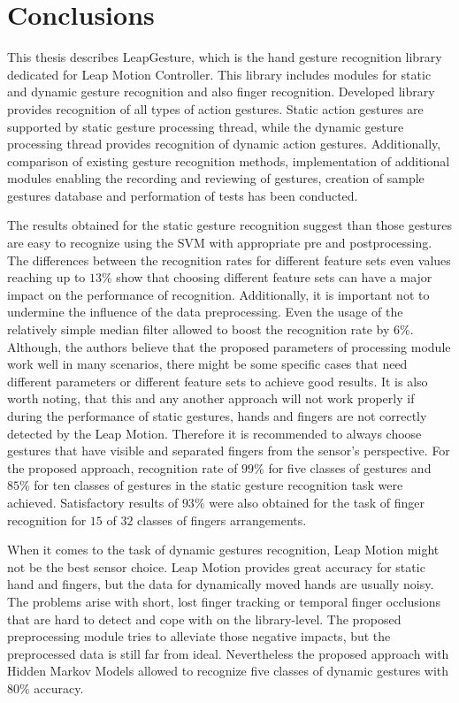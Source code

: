 \chapter{Conclusions}\label{conclusionsChapter}

This thesis describes LeapGesture, which is the hand gesture recognition library dedicated for Leap Motion Controller.
This library includes modules for static and dynamic gesture recognition and also finger recognition.
Developed library provides recognition of all types of action gestures.
Static action gestures are supported by static gesture processing thread, while the dynamic gesture processing thread provides recognition of dynamic action gestures.
Additionally, comparison of existing gesture recognition methods, implementation of additional modules enabling the recording and reviewing of gestures, creation of sample gestures database and performation of tests has been conducted.

The results obtained for the static gesture recognition suggest than those gestures are easy to recognize using the SVM with appropriate pre and postprocessing.
The differences between the recognition rates for different feature sets even values reaching up to $13\%$ show that choosing different feature sets can have a major impact on the performance of recognition.
Additionally, it is important not to undermine the influence of the data preprocessing. 
Even the usage of the relatively simple median filter allowed to boost the recognition rate by $6\%$.
Although, the authors believe that the proposed parameters of processing module work well in many scenarios, there might be some specific cases that need different parameters or different feature sets to achieve good results.
It is also worth noting, that this and any another approach will not work properly if during the performance of static gestures, hands and fingers are not correctly detected by the Leap Motion.
Therefore it is recommended to always choose gestures that have visible and separated fingers from the sensor's perspective.
For the proposed approach, recognition rate of $99\%$ for five classes of gestures and $85\%$ for ten classes of gestures in the static gesture recognition task were achieved. Satisfactory results of $93\%$ were also obtained for the task of finger recognition for $15$ of $32$ classes of fingers arrangements.

When it comes to the task of dynamic gestures recognition, Leap Motion might not be the best sensor choice.
Leap Motion provides great accuracy for static hand and fingers, but the data for dynamically moved hands are usually noisy.
The problems arise with short, lost finger tracking or temporal finger occlusions that are hard to detect and cope with on the library-level.
The proposed preprocessing module tries to alleviate those negative impacts, but the preprocessed data is still far from ideal.
Nevertheless the proposed approach with Hidden Markov Models allowed to recognize five classes of dynamic gestures with $80\%$ accuracy.

